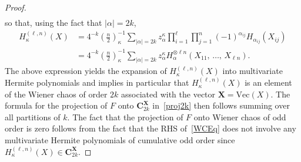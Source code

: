 \documentclass[AHL,Unicode,longabstracts,published]{cedram}
\renewcommand{\Vec}{\mathrm{Vec}}
\newcommand{\bfX}{\mathbf{X}}
\newcommand{\bfC}{\mathbf{C}}
\begin{document}
\begin{proof}
\begin{gather*}
\end{gather*}
so that, using the fact that $|\alpha|=2k$,
\begin{align*}
H_{\kappa}^{(\ell,n)}(X) &= 4^{-k} \left(\frac{n}{2}\right)_{\kappa}^{-1} \sum_{|\alpha|=2k} z_{\alpha}^{\kappa} \prod_{i=1}^{\ell} \prod_{j=1}^n (-1)^{\alpha_{ij}}H_{\alpha_{ij}}(X_{ij}) \\
&= 4^{-k} \left(\frac{n}{2}\right)_{\kappa}^{-1} \sum_{|\alpha|=2k} z_{\alpha}^{\kappa} H_{\alpha}^{\otimes \ell n}(X_{11},\,\ldots,\,X_{\ell n}).
\end{align*}
The above expression yields the expansion of $H_{\kappa}^{(\ell,n)}(X)$ into multivariate Hermite polynomials and implies in particular that $H_{\kappa}^{(\ell,n)}(X)$ is an element of the Wiener chaos of order $2k$ associated with the vector $\bfX=\Vec(X)$. The formula for the projection of $F$ onto $\bfC_{2k}^{\bfX}$ in~\eqref{proj2k} then follows summing over all partitions of $k$. The fact that the projection of $F$ onto Wiener chaos of odd order is zero follows from the fact that the RHS of~\eqref{WCEq} does not involve any multivariate Hermite polynomials of cumulative odd order since $H_{\kappa}^{(\ell,n)}(X) \in \bfC_{2k}^{\bfX}$.


\end{proof}
\end{document}
